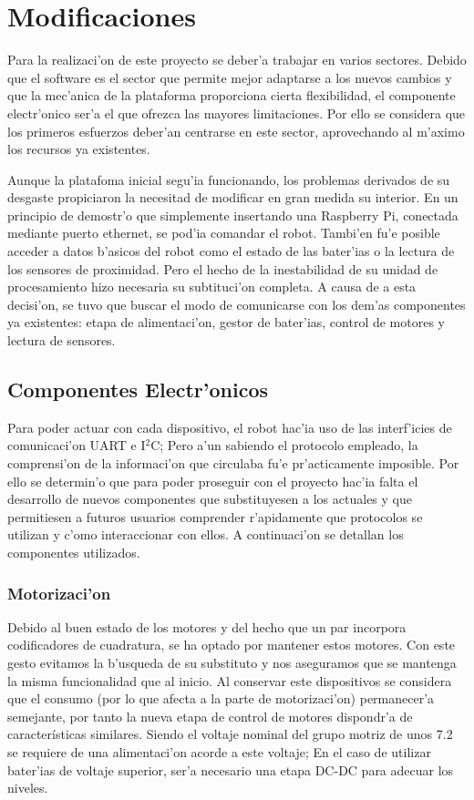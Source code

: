 \documentclass[twoside,12pt]{article}
\begin{document}
\newpage
\section{Modificaciones}
Para la realizaci'on de este proyecto se deber'a trabajar en varios sectores. Debido que el software es el sector que permite mejor adaptarse a los nuevos cambios y que la mec'anica de la plataforma proporciona cierta flexibilidad, el componente electr'onico ser'a el que ofrezca las mayores limitaciones. Por ello se considera que los primeros esfuerzos deber'an centrarse en este sector, aprovechando al m'aximo los recursos ya existentes.


Aunque la platafoma inicial segu'ia funcionando, los problemas derivados de su desgaste propiciaron la necesitad de modificar en gran medida su interior. En un principio de demostr'o que simplemente insertando una Raspberry Pi, conectada mediante puerto ethernet, se pod'ia comandar el robot. Tambi'en fu'e posible acceder a datos b'asicos del robot como el estado de las bater'ias o la lectura de los sensores de proximidad. Pero el hecho de la inestabilidad de su unidad de procesamiento hizo necesaria su subtituci'on completa. A causa de a esta decisi'on, se tuvo que buscar el modo de comunicarse con los dem'as componentes ya existentes: etapa de alimentaci'on, gestor de bater'ias, control de motores y lectura de sensores. 

\subsection{ Componentes Electr'onicos}
Para poder actuar con cada dispositivo, el robot hac'ia uso de las interf'icies de comunicaci'on UART e I$^{2}$C; Pero a'un sabiendo el protocolo empleado, la comprensi'on de la informaci'on que circulaba fu'e pr'acticamente imposible. Por ello se determin'o que para poder proseguir con el proyecto hac'ia falta el desarrollo de nuevos componentes que substituyesen a los actuales y que permitiesen a futuros usuarios comprender r'apidamente que protocolos se utilizan y c'omo interaccionar con ellos. A continuaci'on se detallan los componentes utilizados.

\subsubsection{Motorizaci'on}
Debido al buen estado de los motores y del hecho que un par incorpora codificadores de cuadratura, se ha optado por mantener estos motores. Con este gesto evitamos la b'usqueda de su substituto y nos aseguramos que se mantenga la misma funcionalidad que al inicio. Al conservar este dispositivos se considera que el consumo (por lo que afecta a la parte de motorizaci'on) permanecer'a semejante, por tanto la nueva etapa de control de motores dispondr'a de características similares. Siendo el voltaje nominal del grupo motriz de unos 7.2 se requiere de una alimentaci'on acorde a este voltaje; En el caso de utilizar bater'ias de voltaje superior, ser'a necesario una etapa DC-DC para adecuar los niveles.
\end{document}
